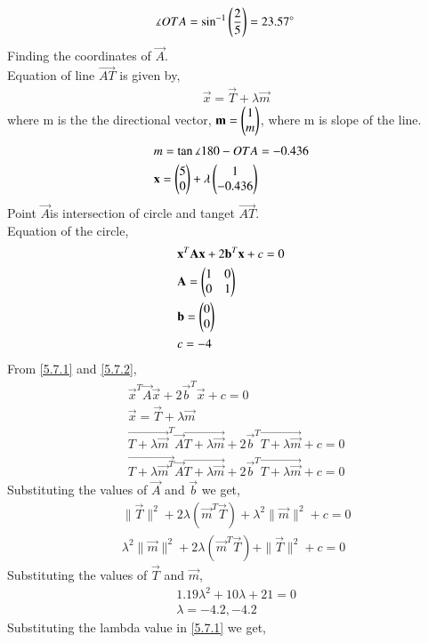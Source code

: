 \documentclass[journal,12pt,twocolumn]{IEEEtran}
\renewcommand\thesection{\arabic{section}}
\begin{document}
\begin{enumerate}[label=\thesection.\arabic*.,ref=\thesection.\theenumi]
\begin{align}
&\measuredangle{OTA} = \sin^{-1}\left(\dfrac{2}{5}\right) = 23.57\degree 
\end{align} 
Finding the coordinates of $\vec{A}$.\\
Equation of line $\vec{AT}$ is given by,
\begin{align}
& \vec{x} = \vec{T} +\lambda\vec{m} \label{5.7.1}
\end{align}
where m is the the directional vector, $\mathbf{m} = \begin{pmatrix}1\\ m \end{pmatrix}$, where m is slope of the line.
\begin{align}
& m=\tan \measuredangle{180 - OTA} = -0.436\\
& \mathbf{x} = \begin{pmatrix}5\\0\end{pmatrix} +\lambda\begin{pmatrix}1\\-0.436\end{pmatrix}
\end{align}
Point $\vec{A} $is intersection of circle and tanget $\vec{AT}.$\\
Equation of the circle,
\begin{align}
& \mathbf{x}^T\mathbf{A}\mathbf{x} +2\mathbf{b}^T\mathbf{x}+c=0\\ \label{5.7.2}
&\mathbf{A} = \begin{pmatrix}1&0\\0&1\end{pmatrix}\\
&\mathbf{b} = \begin{pmatrix}0\\0\end{pmatrix}\\
&c = -4
\end{align}
From \eqref{5.7.1} and \eqref{5.7.2},
\begin{align}
& \vec{x}^T\vec{A}\vec{x} +2\vec{b}^T\vec{x}+c=0\\
& \vec{x} = \vec{T} +\lambda\vec{m} \\
& \vec{T+\lambda\vec{m}}^T\vec{A}\vec{T+\lambda\vec{m}} +2\vec{b}^T \vec{T+\lambda\vec{m}}+c = 0 \\
& \vec{T+\lambda\vec{m}^T}\vec{A}\vec{T+\lambda\vec{m}} +2\vec{b}^T \vec{T+\lambda\vec{m}}+c = 0
\end{align}
Substituting the values of $\vec{A}$ and $\vec{b}$ we get,
\begin{align}
& \|\vec{T}\|^2+2\lambda(\vec{m}^T\vec{T})+\lambda^2\|\vec{m}\|^2+c = 0 \\
& \lambda^2\|\vec{m}\|^2 +2\lambda(\vec{m}^T\vec{T}) + \|\vec{T}\|^2 + c = 0
\end{align}
Substituting the values of $\vec{T}$ and $\vec{m}$,
\begin{align}
&1.19\lambda^2 +10\lambda +21 = 0\\
&\lambda = -4.2,-4.2
\end{align}
Substituting the lambda value in \eqref{5.7.1} we get,

\end{enumerate}
\end{document}
